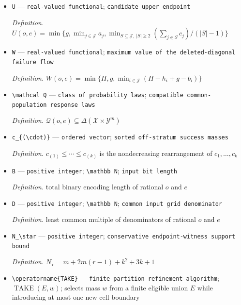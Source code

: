 \documentclass{article}
\begin{document}
\begin{itemize}
  \item \texttt{U} --- \texttt{real-\allowbreak{}valued functional}; \texttt{candidate upper endpoint}
  \par\smallskip\noindent\emph{Definition.} \(U(o,e)=\min\{g,\min_{j\in\mathcal J}a_j,\min_{S\subseteq\mathcal J,\ |S|\geq2}(\sum_{j\in S}c_j)/(|S|-1)\}\)
  \item \texttt{W} --- \texttt{real-\allowbreak{}valued functional}; \texttt{maximum value of the deleted-\allowbreak{}diagonal failure flow}
  \par\smallskip\noindent\emph{Definition.} \(W(o,e)=\min\{H,g,\min_{i\in\mathcal J}(H-h_i+g-b_i)\}\)
  \item \texttt{\textbackslash{}\allowbreak{}mathcal Q} --- \texttt{class of probability laws}; \texttt{compatible common-\allowbreak{}population response laws}
  \par\smallskip\noindent\emph{Definition.} \(\mathcal Q(o,e)\subseteq\Delta(\mathcal X\times\mathcal Y^m)\)
  \item \texttt{c\_\allowbreak{}\{(\textbackslash{}\allowbreak{}cdot)\}\allowbreak{}} --- \texttt{ordered vector}; \texttt{sorted off-\allowbreak{}stratum success masses}
  \par\smallskip\noindent\emph{Definition.} \(c_{(1)}\leq\cdots\leq c_{(k)}\) is the nondecreasing rearrangement of \(c_1,\ldots,c_k\)
  \item \texttt{B} --- \texttt{positive integer}; \texttt{\textbackslash{}\allowbreak{}mathbb N}; \texttt{input bit length}
  \par\smallskip\noindent\emph{Definition.} total binary encoding length of rational \(o\) and \(e\)
  \item \texttt{D} --- \texttt{positive integer}; \texttt{\textbackslash{}\allowbreak{}mathbb N}; \texttt{common input grid denominator}
  \par\smallskip\noindent\emph{Definition.} least common multiple of denominators of rational \(o\) and \(e\)
  \item \texttt{N\_\allowbreak{}\textbackslash{}\allowbreak{}star} --- \texttt{positive integer}; \texttt{conservative endpoint-\allowbreak{}witness support bound}
  \par\smallskip\noindent\emph{Definition.} \(N_\star=m+2m(r-1)+k^2+3k+1\)
  \item \texttt{\textbackslash{}\allowbreak{}operatorname\{TAKE\}\allowbreak{}} --- \texttt{finite partition-\allowbreak{}refinement algorithm}; \(\operatorname{TAKE}(E,w)\); selects mass \(w\) from a finite eligible union \(E\) while introducing at most one new cell boundary

\end{itemize}
\end{document}
